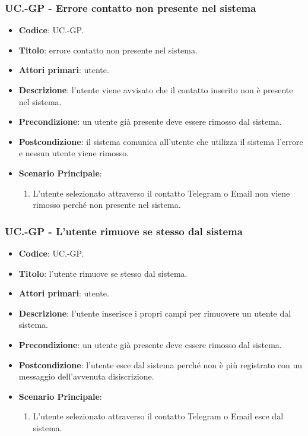 			\subsubsection{UC\theuccount.\thesubuccount-GP - Errore contatto non presente nel sistema}
					
				\begin{itemize}
					\item \textbf{Codice}: UC\theuccount.\thesubuccount-GP.
					\item \textbf{Titolo}: errore contatto non presente nel sistema.
					\item \textbf{Attori primari}: utente.
					\item \textbf{Descrizione}: l’utente viene avvisato che il contatto inserito non è presente nel sistema.
					\item \textbf{Precondizione}: un utente già presente deve essere rimosso dal sistema.
					\item \textbf{Postcondizione}: il sistema comunica all’utente che utilizza il sistema l’errore e nessun utente viene rimosso.
					\item \textbf{Scenario Principale}:
					\begin{enumerate}
						\item L'utente selezionato attraverso il contatto Telegram o Email non viene rimosso perché non presente nel sistema.
					\end{enumerate}
				\end{itemize}
			
			\subsubsection{UC\theuccount.\thesubuccount-GP - L'utente rimuove se stesso dal sistema}
			
			\begin{itemize}
				\item \textbf{Codice}: UC\theuccount.\thesubuccount-GP.
				\item \textbf{Titolo}: l'utente rimuove se stesso dal sistema.
				\item \textbf{Attori primari}: utente.
				\item \textbf{Descrizione}:  l’utente inserisce i propri campi per rimuovere un utente dal sistema.
				\item \textbf{Precondizione}: un utente già presente deve essere rimosso dal sistema.
				\item \textbf{Postcondizione}:  l'utente esce dal sistema perché non è più registrato con un messaggio dell'avvenuta disiscrizione.
				\item \textbf{Scenario Principale}:
				\begin{enumerate}
					\item L'utente selezionato attraverso il contatto Telegram o Email esce dal sistema.
				\end{enumerate}
			\end{itemize}